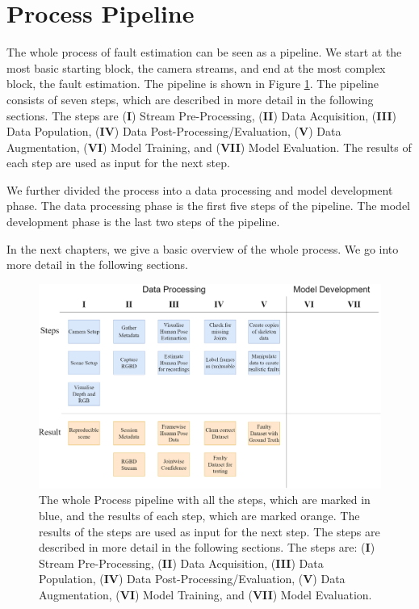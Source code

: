 \section{Process Pipeline}
\label{sec:process_pipeline}

The whole process of fault estimation can be seen as a pipeline. We start at the most basic starting block, the camera streams, and end at the most complex block, the fault estimation. The pipeline is shown in Figure \ref{fig:process_pipeline}. The pipeline consists of seven steps, which are described in more detail in the following sections. The steps are (\textbf{I}) Stream Pre-Processing, (\textbf{II}) Data Acquisition, (\textbf{III}) Data Population, (\textbf{IV}) Data Post-Processing/Evaluation, (\textbf{V}) Data Augmentation, (\textbf{VI}) Model Training, and (\textbf{VII}) Model Evaluation. The results of each step are used as input for the next step. 

We further divided the process into a data processing and model development phase. The data processing phase is the first five steps of the pipeline. The model development phase is the last two steps of the pipeline.

In the next chapters, we give a basic overview of the whole process. We go into more detail in the following sections.

\begin{figure}[ht]
    \centering
    \includegraphics[width=\textwidth]{figures/ProcessingPipeline/ProcessingPipeline.png}
    \caption[Process Pipeline with all steps]{The whole Process pipeline with all the steps, which are marked in blue, and the results of each step, which are marked orange. The results of the steps are used as input for the next step. The steps are described in more detail in the following sections. The steps are: (\textbf{I}) Stream Pre-Processing, (\textbf{II}) Data Acquisition, (\textbf{III}) Data Population, (\textbf{IV}) Data Post-Processing/Evaluation, (\textbf{V}) Data Augmentation, (\textbf{VI}) Model Training, and (\textbf{VII}) Model Evaluation.}
    \label{fig:process_pipeline}
\end{figure}
